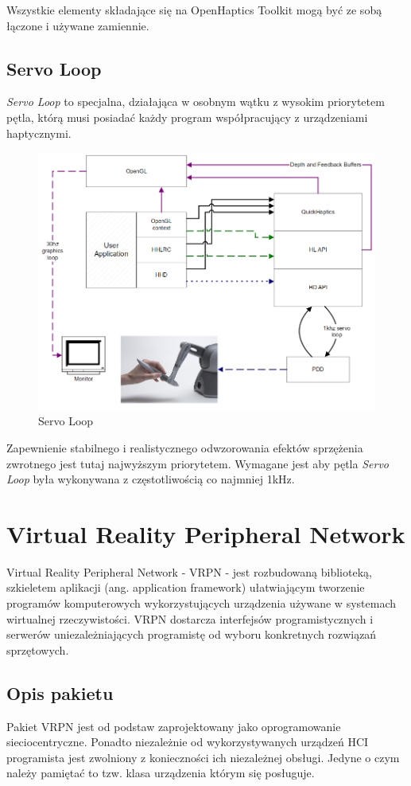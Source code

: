 \documentclass[licencjacka]{pracamgr}
\begin{document}
Wszystkie elementy składające się na OpenHaptics Toolkit mogą być ze sobą łączone i używane zamiennie. 

\section{Servo Loop}
\textit{Servo Loop} to specjalna, działająca w osobnym wątku z wysokim priorytetem pętla, którą musi posiadać każdy program współpracujący z urządzeniami haptycznymi.

\begin{figure}[H]
\centering
\includegraphics[scale=0.5,center]{servoloop}
\caption{Servo Loop}
\end{figure}

Zapewnienie stabilnego i realistycznego odwzorowania efektów sprzężenia zwrotnego jest tutaj najwyższym priorytetem. Wymagane jest aby pętla \textit{Servo Loop} była wykonywana z częstotliwością co najmniej 1kHz.

\chapter{Virtual Reality Peripheral Network}
Virtual Reality Peripheral Network - VRPN - jest rozbudowaną biblioteką, szkieletem aplikacji (ang. application framework) ułatwiającym tworzenie programów komputerowych wykorzystujących urządzenia używane w systemach wirtualnej rzeczywistości. VRPN dostarcza interfejsów programistycznych i serwerów uniezależniających programistę od wyboru konkretnych rozwiązań sprzętowych.

\section{Opis pakietu}
Pakiet VRPN jest od podstaw zaprojektowany jako oprogramowanie sieciocentryczne. Ponadto niezależnie od wykorzystywanych urządzeń HCI programista jest zwolniony z konieczności ich niezależnej obsługi. Jedyne o czym należy pamiętać to tzw. klasa urządzenia którym się posługuje. 
\end{document}
